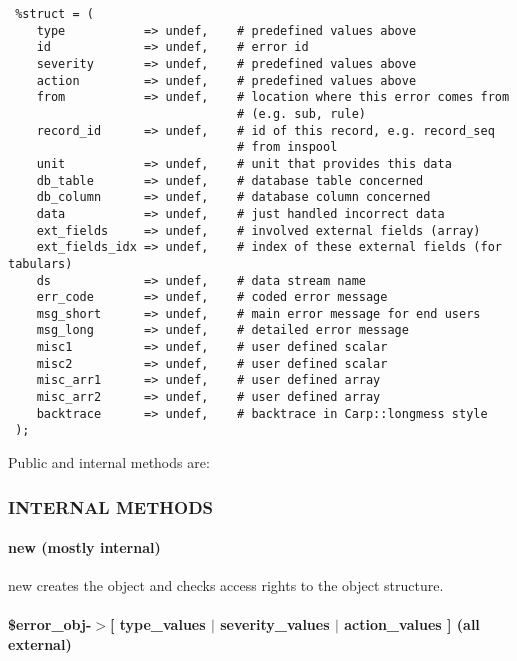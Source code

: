 \begin{verbatim}
 %struct = (
    type           => undef,    # predefined values above
    id             => undef,    # error id
    severity       => undef,    # predefined values above
    action         => undef,    # predefined values above
    from           => undef,    # location where this error comes from
                                # (e.g. sub, rule)
    record_id      => undef,    # id of this record, e.g. record_seq
                                # from inspool
    unit           => undef,    # unit that provides this data
    db_table       => undef,    # database table concerned
    db_column      => undef,    # database column concerned
    data           => undef,    # just handled incorrect data
    ext_fields     => undef,    # involved external fields (array)
    ext_fields_idx => undef,    # index of these external fields (for tabulars)
    ds             => undef,    # data stream name
    err_code       => undef,    # coded error message
    msg_short      => undef,    # main error message for end users
    msg_long       => undef,    # detailed error message
    misc1          => undef,    # user defined scalar
    misc2          => undef,    # user defined scalar
    misc_arr1      => undef,    # user defined array
    misc_arr2      => undef,    # user defined array
    backtrace      => undef,    # backtrace in Carp::longmess style
 );
\end{verbatim}


Public and internal methods are:

\subsubsection*{INTERNAL METHODS\label{Apiis::Errors_--_Provide_error_objects_for_generic_error_handling_in_APIIS_INTERNAL_METHODS}}
\paragraph*{new (mostly internal)\label{Apiis::Errors_--_Provide_error_objects_for_generic_error_handling_in_APIIS_new_mostly_internal_}}


new creates the object and checks access rights to the object structure.

\paragraph*{\$error\_obj-$>$[ type\_values $|$ severity\_values $|$ action\_values ] (all external)\label{Apiis::Errors_--_Provide_error_objects_for_generic_error_handling_in_APIIS__error_obj-_type_values_severity_values_action_values_all_external_}}


